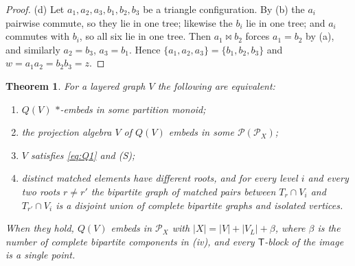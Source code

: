 \documentclass[11pt]{amsart}
\newtheorem{theorem}{Theorem}[section]
\theoremstyle{definition}
\renewcommand{\P}{\mathcal{P}}
\newcommand{\T}{\mathsf{T}}
\newcommand{\mt}{\bowtie}   %
\begin{document}
\begin{proof}
(d) Let $a_1,a_2,a_3,b_1,b_2,b_3$ be a triangle configuration. By (b) the $a_i$ pairwise commute, so they lie in one tree; likewise the $b_i$ lie in one tree; and $a_i$ commutes with $b_i$, so all six lie in one tree. Then $a_1\mt b_2$ forces $a_1=b_2$ by (a), and similarly $a_2=b_3$, $a_3=b_1$. Hence $\{a_1,a_2,a_3\}=\{b_1,b_2,b_3\}$ and $w=a_1a_2=b_2b_3=z$.
\end{proof}

\begin{theorem}\label{thm:layered}
For a layered graph $V$ the following are equivalent:
\begin{enumerate}[label=\textup{(\roman*)},nosep]
\item $Q(V)$ $*$-embeds in some partition monoid;
\item the projection algebra $V$ of $Q(V)$ embeds in some $\P(\P_X)$;
\item $V$ satisfies \eqref{eq:Q1} and (S);
\item distinct matched elements have different roots, and for every level $i$ and every two roots $r\ne r'$ the bipartite graph of matched pairs between $T_r\cap V_i$ and $T_{r'}\cap V_i$ is a disjoint union of complete bipartite graphs and isolated vertices.
\end{enumerate}
When they hold, $Q(V)$ embeds in $\P_X$ with $|X|=|V|+|V_L|+\beta$, where $\beta$ is the number of complete bipartite components in (iv), and every $\T$-block of the image is a single point.
\end{theorem}
\end{document}
